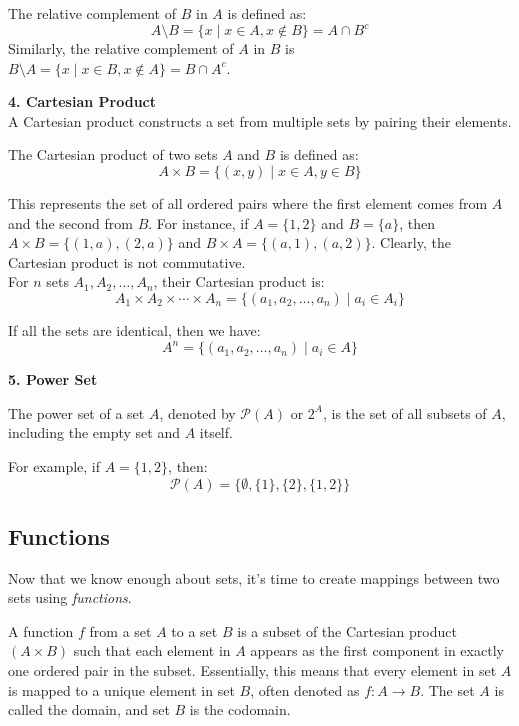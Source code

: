 \begin{definition}
    The relative complement of \(B\) in \(A\) is defined as:
\[
A \setminus B = \{x \mid x \in A, x \notin B\} = A \cap B^c
\]
Similarly, the relative complement of \(A\) in \(B\) is \(B \setminus A = \{x \mid x \in B, x \notin A\} = B \cap A^c\).
\end{definition}

\textbf{4. Cartesian Product} \\

A Cartesian product constructs a set from multiple sets by pairing their elements.

\begin{definition}
    The Cartesian product of two sets \(A\) and \(B\) is defined as:
\[
A \times B = \{(x, y) \mid x \in A, y \in B\}
\]
\end{definition}

This represents the set of all ordered pairs where the first element comes from \(A\) and the second from \(B\). For instance, if \(A = \{1, 2\}\) and \(B = \{a\}\), then \(A \times B = \{(1, a), (2, a)\}\) and \(B \times A = \{(a, 1), (a, 2)\}\). Clearly, the Cartesian product is not commutative. \\

For \(n\) sets \(A_1, A_2, \ldots, A_n\), their Cartesian product is:
\[
A_1 \times A_2 \times \cdots \times A_n = \{(a_1, a_2, \ldots, a_n) \mid a_i \in A_i\}
\]


If all the sets are identical, then we have:
\[
A^n = \{(a_1, a_2, \ldots, a_n) \mid a_i \in A\}
\]

\textbf{5. Power Set}

\begin{definition}
    The power set of a set \(A\), denoted by \(\mathcal{P}(A)\) or \(2^A\), is the set of all subsets of \(A\), including the empty set and \(A\) itself. 
\end{definition}

For example, if \(A = \{1, 2\}\), then:
\[
\mathcal{P}(A) = \{\emptyset, \{1\}, \{2\}, \{1, 2\}\}
\]

\subsection{Functions}

Now that we know enough about sets, it's time to create mappings between two sets using \textit{functions}.

\begin{definition}
    A function $f$ from a set $A$ to a set $B$ is a subset of the Cartesian product $(A \times B)$ such that each element in $A$ appears as the first component in exactly one ordered pair in the subset. Essentially, this means that every element in set $A$ is mapped to a unique element in set $B$, often denoted as $f: A \to B$. The set $A$ is called the domain, and set $B$ is the codomain.
\end{definition}

